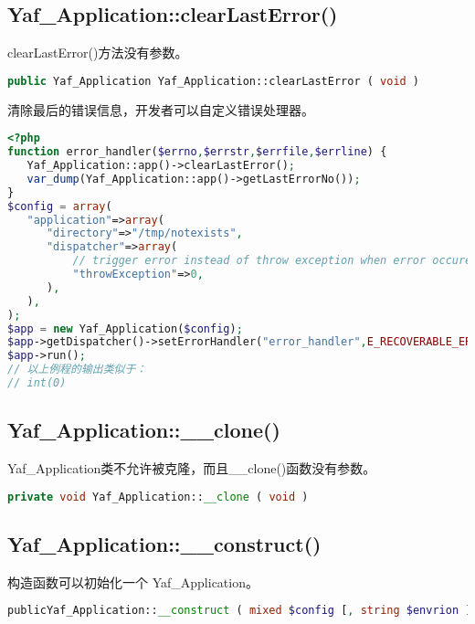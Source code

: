 \subsection{Yaf\_Application::clearLastError()}

clearLastError()方法没有参数。

\begin{lstlisting}[language=PHP]
public Yaf_Application Yaf_Application::clearLastError ( void )
\end{lstlisting}

清除最后的错误信息，开发者可以自定义错误处理器。


\begin{lstlisting}[language=PHP]
<?php
function error_handler($errno,$errstr,$errfile,$errline) {
   Yaf_Application::app()->clearLastError();
   var_dump(Yaf_Application::app()->getLastErrorNo());
}
$config = array(
   "application"=>array(
      "directory"=>"/tmp/notexists",
      "dispatcher"=>array(
          // trigger error instead of throw exception when error occure
          "throwException"=>0,
      ),
   ),
);
$app = new Yaf_Application($config);
$app->getDispatcher()->setErrorHandler("error_handler",E_RECOVERABLE_ERROR);
$app->run();
// 以上例程的输出类似于：
// int(0)
\end{lstlisting}





\subsection{Yaf\_Application::\_\_clone()}

Yaf\_Application类不允许被克隆，而且\_\_clone()函数没有参数。






\begin{lstlisting}[language=PHP]
private void Yaf_Application::__clone ( void )
\end{lstlisting}





\subsection{Yaf\_Application::\_\_construct()}

构造函数可以初始化一个 Yaf\_Application。




\begin{lstlisting}[language=PHP]
publicYaf_Application::__construct ( mixed $config [, string $envrion ] )
\end{lstlisting}

